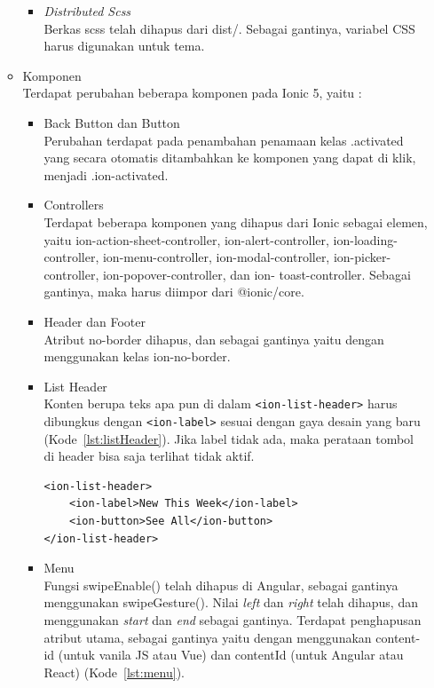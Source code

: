 \begin{enumerate}
\begin{itemize}
\begin{itemize}
			\item {\it Distributed Scss} \\
			Berkas scss telah dihapus dari dist/. Sebagai gantinya, variabel CSS harus digunakan untuk tema.

		\end{itemize}

		\item Komponen\\
		Terdapat perubahan beberapa komponen pada Ionic 5, yaitu :
		\begin{itemize}
			\item Back Button dan Button  \\
			Perubahan terdapat pada penambahan penamaan kelas .activated yang secara otomatis ditambahkan ke komponen yang dapat di klik, menjadi .ion-activated.
			
			\item Controllers\\
			Terdapat beberapa komponen yang dihapus dari Ionic sebagai elemen, yaitu ion-action-sheet-controller, ion-alert-controller, ion-loading-controller, ion-menu-controller, ion-modal-controller, ion-picker-controller, ion-popover-controller, dan ion- toast-controller. Sebagai gantinya, maka harus diimpor dari @ionic/core. 
			\item Header dan Footer\\
			Atribut no-border dihapus, dan sebagai gantinya yaitu dengan menggunakan kelas ion-no-border.
			
			\item List Header\\
			Konten berupa teks apa pun di dalam \texttt{<ion-list-header>} harus dibungkus dengan \texttt{<ion-label>} sesuai dengan gaya desain yang baru (Kode~\ref{lst:listHeader}). Jika label tidak ada, maka perataan tombol di header bisa saja terlihat tidak aktif. 

\begin{lstlisting}[label={lst:listHeader}, caption=Kode Program untuk List Header]
<ion-list-header>
	<ion-label>New This Week</ion-label>
	<ion-button>See All</ion-button>
</ion-list-header>
\end{lstlisting}
			\item Menu\\
			Fungsi swipeEnable() telah dihapus di Angular, sebagai gantinya menggunakan swipeGesture(). Nilai {\it left} dan {\it right} telah dihapus, dan menggunakan {\it start} dan {\it end} sebagai gantinya. Terdapat penghapusan atribut utama, sebagai gantinya yaitu dengan menggunakan content-id (untuk vanila JS atau Vue) dan contentId (untuk Angular atau React) (Kode~\ref{lst:menu}).			
			

\end{itemize}
\end{itemize}
\end{enumerate}
